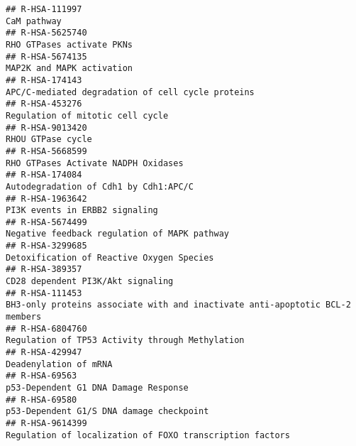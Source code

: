 \documentclass[
]{article}
\begin{document}
\begin{verbatim}
## R-HSA-111997                                                                                                                           CaM pathway
## R-HSA-5625740                                                                                                            RHO GTPases activate PKNs
## R-HSA-5674135                                                                                                            MAP2K and MAPK activation
## R-HSA-174143                                                                                     APC/C-mediated degradation of cell cycle proteins
## R-HSA-453276                                                                                                      Regulation of mitotic cell cycle
## R-HSA-9013420                                                                                                                    RHOU GTPase cycle
## R-HSA-5668599                                                                                                  RHO GTPases Activate NADPH Oxidases
## R-HSA-174084                                                                                                 Autodegradation of Cdh1 by Cdh1:APC/C
## R-HSA-1963642                                                                                                       PI3K events in ERBB2 signaling
## R-HSA-5674499                                                                                         Negative feedback regulation of MAPK pathway
## R-HSA-3299685                                                                                            Detoxification of Reactive Oxygen Species
## R-HSA-389357                                                                                                     CD28 dependent PI3K/Akt signaling
## R-HSA-111453                                                          BH3-only proteins associate with and inactivate anti-apoptotic BCL-2 members
## R-HSA-6804760                                                                                      Regulation of TP53 Activity through Methylation
## R-HSA-429947                                                                                                                 Deadenylation of mRNA
## R-HSA-69563                                                                                                   p53-Dependent G1 DNA Damage Response
## R-HSA-69580                                                                                               p53-Dependent G1/S DNA damage checkpoint
## R-HSA-9614399                                                                             Regulation of localization of FOXO transcription factors

\end{verbatim}
\end{document}
